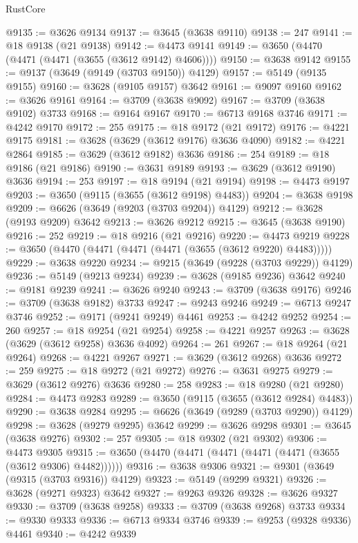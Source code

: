 \begin{lexlean}{RustCore}
\begin{coremodule}
@9135 := @3626 @9134
@9137 := @3645 (@3638 @9110)
@9138 := 247
@9141 := @18 @9138 (@21 @9138)
@9142 := @4473 @9141
@9149 := @3650 (@4470 (@4471 (@4471 (@3655 (@3612 @9142) @4606))))
@9150 := @3638 @9142
@9155 := @9137 (@3649 (@9149 (@3703 @9150)) @4129)
@9157 := @5149 (@9135 @9155)
@9160 := @3628 (@9105 @9157) @3642
@9161 := @9097 @9160
@9162 := @3626 @9161
@9164 := @3709 (@3638 @9092)
@9167 := @3709 (@3638 @9102) @3733
@9168 := @9164 @9167
@9170 := @6713 @9168 @3746
@9171 := @4242 @9170
@9172 := 255
@9175 := @18 @9172 (@21 @9172)
@9176 := @4221 @9175
@9181 := @3628 (@3629 (@3612 @9176) @3636 @4090)
@9182 := @4221 @2864
@9185 := @3629 (@3612 @9182) @3636
@9186 := 254
@9189 := @18 @9186 (@21 @9186)
@9190 := @3631 @9189
@9193 := @3629 (@3612 @9190) @3636
@9194 := 253
@9197 := @18 @9194 (@21 @9194)
@9198 := @4473 @9197
@9203 := @3650 (@9115 (@3655 (@3612 @9198) @4483))
@9204 := @3638 @9198
@9209 := @6626 (@3649 (@9203 (@3703 @9204)) @4129)
@9212 := @3628 (@9193 @9209) @3642
@9213 := @3626 @9212
@9215 := @3645 (@3638 @9190)
@9216 := 252
@9219 := @18 @9216 (@21 @9216)
@9220 := @4473 @9219
@9228 := @3650 (@4470 (@4471 (@4471 (@4471 (@3655 (@3612 @9220) @4483)))))
@9229 := @3638 @9220
@9234 := @9215 (@3649 (@9228 (@3703 @9229)) @4129)
@9236 := @5149 (@9213 @9234)
@9239 := @3628 (@9185 @9236) @3642
@9240 := @9181 @9239
@9241 := @3626 @9240
@9243 := @3709 (@3638 @9176)
@9246 := @3709 (@3638 @9182) @3733
@9247 := @9243 @9246
@9249 := @6713 @9247 @3746
@9252 := @9171 (@9241 @9249) @4461
@9253 := @4242 @9252
@9254 := 260
@9257 := @18 @9254 (@21 @9254)
@9258 := @4221 @9257
@9263 := @3628 (@3629 (@3612 @9258) @3636 @4092)
@9264 := 261
@9267 := @18 @9264 (@21 @9264)
@9268 := @4221 @9267
@9271 := @3629 (@3612 @9268) @3636
@9272 := 259
@9275 := @18 @9272 (@21 @9272)
@9276 := @3631 @9275
@9279 := @3629 (@3612 @9276) @3636
@9280 := 258
@9283 := @18 @9280 (@21 @9280)
@9284 := @4473 @9283
@9289 := @3650 (@9115 (@3655 (@3612 @9284) @4483))
@9290 := @3638 @9284
@9295 := @6626 (@3649 (@9289 (@3703 @9290)) @4129)
@9298 := @3628 (@9279 @9295) @3642
@9299 := @3626 @9298
@9301 := @3645 (@3638 @9276)
@9302 := 257
@9305 := @18 @9302 (@21 @9302)
@9306 := @4473 @9305
@9315 := @3650 (@4470 (@4471 (@4471 (@4471 (@4471 (@3655 (@3612 @9306) @4482))))))
@9316 := @3638 @9306
@9321 := @9301 (@3649 (@9315 (@3703 @9316)) @4129)
@9323 := @5149 (@9299 @9321)
@9326 := @3628 (@9271 @9323) @3642
@9327 := @9263 @9326
@9328 := @3626 @9327
@9330 := @3709 (@3638 @9258)
@9333 := @3709 (@3638 @9268) @3733
@9334 := @9330 @9333
@9336 := @6713 @9334 @3746
@9339 := @9253 (@9328 @9336) @4461
@9340 := @4242 @9339

\end{coremodule}
\end{lexlean}
